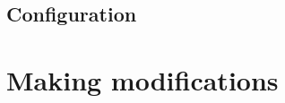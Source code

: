 \documentclass{softwaremanual}
\begin{document}
\section{Configuration}\label{sec:config}


\chapter{Making modifications}\label{chap:Mods}






\end{document}
